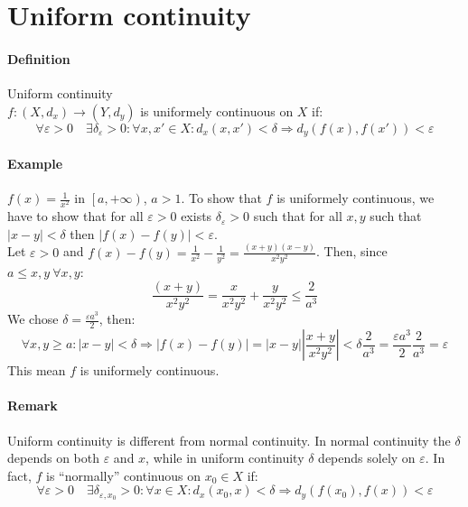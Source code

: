 \documentclass{article}
\newcommand{\abs}[1]{\left|#1\right|}
\newcommand{\func}[3]{#1 : #2 \rightarrow #3}
\newcommand{\Ep}{\varepsilon}
\newcommand{\Def}{\paragraph{Definition}}
\newcommand{\Remark}{\paragraph{Remark}}
\newcommand{\Example}{\paragraph{Example}}
\begin{document}
\section{Uniform continuity}

  \Def Uniform continuity
\\$\func{f}{(X,d_x)}{(Y,d_y)}$ is uniformely continuous on $X$ if:
\begin{equation*}
  \forall \Ep > 0 \quad \exists \delta_\Ep > 0 : \forall x,x' \in X : d_x(x,x')
  < \delta \Rightarrow d_y(f(x),f(x')) < \Ep
\end{equation*}

  \Example $f(x) = \frac{1}{x^2}$ in $\left[a, +\infty\right)$, $a > 1$. To show
  that $f$ is uniformely continuous, we have to show that for all $\Ep > 0$
  exists $\delta_\Ep > 0$ such that for all $x,y$ such that $\abs{x-y} < \delta$
  then $\abs{f(x)-f(y)} < \Ep$.
\\Let $\Ep > 0$ and $f(x) - f(y) = \frac{1}{x^2} - \frac{1}{y^2} =
  \frac{(x+y)(x-y)}{x^2 y^2}$. Then, since $a \leq x,y \ \forall x,y$:
\begin{equation*}
  \frac{(x+y)}{x^2 y^2} = \frac{x}{x^2 y^2} + \frac{y}{x^2 y^2} \leq \frac{2}{a^3}
\end{equation*}
  We chose $\delta = \frac{\Ep a^3}{2}$, then:
\begin{equation*}
  \forall x,y \geq a : \abs{x-y} < \delta \Rightarrow \abs{f(x)-f(y)} =
  \abs{x-y} \abs{\frac{x+y}{x^2 y^2}} < \delta \frac{2}{a^3} =
  \frac{\Ep a^3}{2} \frac{2}{a^3} = \Ep
\end{equation*}
  This mean $f$ is uniformely continuous.

  \Remark Uniform continuity is different from normal continuity. In normal
  continuity the $\delta$ depends on both $\Ep$ and $x$, while in uniform
  continuity $\delta$ depends solely on $\Ep$. In fact, $f$ is ``normally''
  continuous on $x_0 \in X$ if:
\begin{equation*}
  \forall \Ep > 0 \quad \exists \delta_{\Ep,x_0} > 0 : \forall x \in X :
  d_x(x_0,x) < \delta \Rightarrow d_y(f(x_0),f(x)) < \Ep
\end{equation*}
\end{document}
